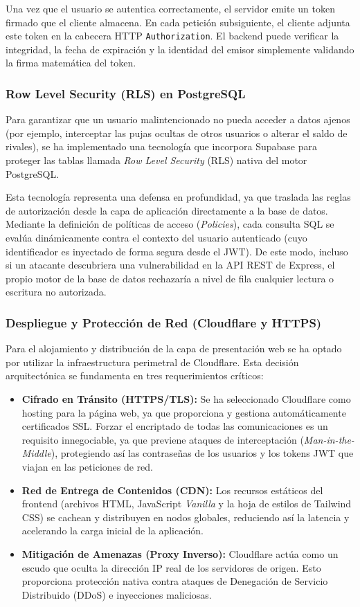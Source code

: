 Una vez que el usuario se autentica correctamente, el servidor emite un token firmado que el cliente almacena. En cada petición subsiguiente, el cliente adjunta este token en la cabecera HTTP \texttt{Authorization}. El backend puede verificar la integridad, la fecha de expiración y la identidad del emisor simplemente validando la firma matemática del token.

\subsubsection{Row Level Security (RLS) en PostgreSQL}
Para garantizar que un usuario malintencionado no pueda acceder a datos ajenos (por ejemplo, interceptar las pujas ocultas de otros usuarios o alterar el saldo de rivales), se ha implementado una tecnología que incorpora Supabase para proteger las tablas llamada \textit{Row Level Security} (RLS) nativa del motor PostgreSQL.

Esta tecnología representa una defensa en profundidad, ya que traslada las reglas de autorización desde la capa de aplicación directamente a la base de datos. Mediante la definición de políticas de acceso (\textit{Policies}), cada consulta SQL se evalúa dinámicamente contra el contexto del usuario autenticado (cuyo identificador es inyectado de forma segura desde el JWT). De este modo, incluso si un atacante descubriera una vulnerabilidad en la API REST de Express, el propio motor de la base de datos rechazaría a nivel de fila cualquier lectura o escritura no autorizada.

\subsubsection{Despliegue y Protección de Red (Cloudflare y HTTPS)}
Para el alojamiento y distribución de la capa de presentación web se ha optado por utilizar la infraestructura perimetral de Cloudflare. Esta decisión arquitectónica se fundamenta en tres requerimientos críticos:

\begin{itemize}
    \item \textbf{Cifrado en Tránsito (HTTPS/TLS):} Se ha seleccionado Cloudflare como hosting para la página web, ya que proporciona y gestiona automáticamente certificados SSL. Forzar el encriptado de todas las comunicaciones es un requisito innegociable, ya que previene ataques de interceptación (\textit{Man-in-the-Middle}), protegiendo así las contraseñas de los usuarios y los tokens JWT que viajan en las peticiones de red.
    \item \textbf{Red de Entrega de Contenidos (CDN):} Los recursos estáticos del frontend (archivos HTML, JavaScript \textit{Vanilla} y la hoja de estilos de Tailwind CSS) se cachean y distribuyen en nodos globales, reduciendo así la latencia y acelerando la carga inicial de la aplicación.
    \item \textbf{Mitigación de Amenazas (Proxy Inverso):} Cloudflare actúa como un escudo que oculta la dirección IP real de los servidores de origen. Esto proporciona protección nativa contra ataques de Denegación de Servicio Distribuido (DDoS) e inyecciones maliciosas.
\end{itemize}

